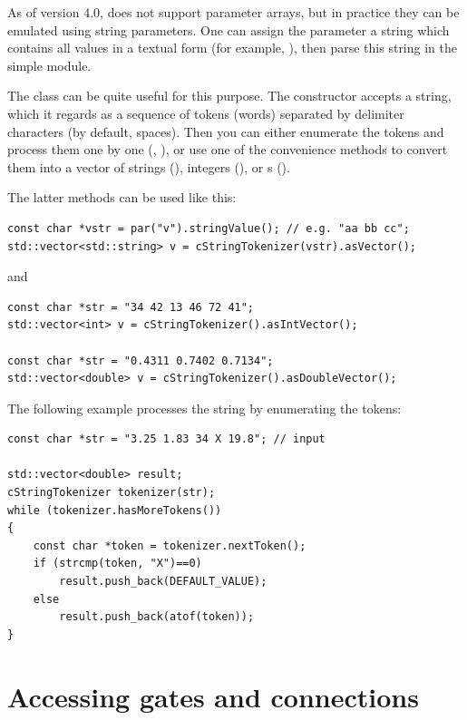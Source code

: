 As of version 4.0, {\opp} does not support parameter arrays,
but in practice they can be emulated using string parameters.
One can assign the parameter a string which contains all values
in a textual form (for example, ), then
parse this string in the simple module.

The  class can be quite useful for this
purpose. The constructor accepts a string, which it regards as
a sequence of tokens (words) separated by delimiter characters
(by default, spaces). Then you can either enumerate the tokens
and process them one by one (, ),
or use one of the  convenience methods to convert
them into a vector of strings (), integers (),
or s ().

The latter methods can be used like this:

\begin{verbatim}
const char *vstr = par("v").stringValue(); // e.g. "aa bb cc";
std::vector<std::string> v = cStringTokenizer(vstr).asVector();
\end{verbatim}

and

\begin{verbatim}
const char *str = "34 42 13 46 72 41";
std::vector<int> v = cStringTokenizer().asIntVector();

const char *str = "0.4311 0.7402 0.7134";
std::vector<double> v = cStringTokenizer().asDoubleVector();
\end{verbatim}

The following example processes the string by enumerating the tokens:

\begin{verbatim}
const char *str = "3.25 1.83 34 X 19.8"; // input

std::vector<double> result;
cStringTokenizer tokenizer(str);
while (tokenizer.hasMoreTokens())
{
    const char *token = tokenizer.nextToken();
    if (strcmp(token, "X")==0)
        result.push_back(DEFAULT_VALUE);
    else
        result.push_back(atof(token));
}
\end{verbatim}



\section{Accessing gates and connections}
\label{ch:simple-modules:gates}

